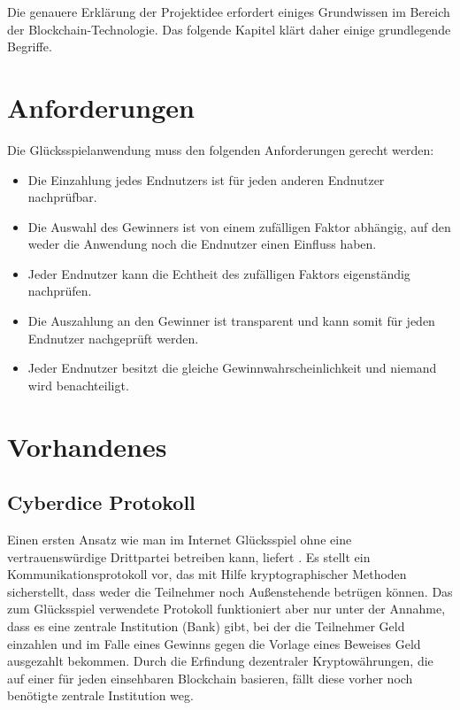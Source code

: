 Die genauere Erklärung der Projektidee erfordert einiges Grundwissen im Bereich der Blockchain-Technologie. Das folgende Kapitel klärt daher einige grundlegende Begriffe.



\section{Anforderungen}
Die Glücksspielanwendung muss den folgenden Anforderungen gerecht werden:
\begin{itemize}
\item Die Einzahlung jedes Endnutzers ist für jeden anderen Endnutzer nachprüfbar.
\item Die Auswahl des Gewinners ist von einem zufälligen Faktor abhängig, auf den weder die Anwendung noch die Endnutzer einen Einfluss haben.
\item Jeder Endnutzer kann die Echtheit des zufälligen Faktors eigenständig nachprüfen.
\item Die Auszahlung an den Gewinner ist transparent und kann somit für jeden Endnutzer nachgeprüft werden.
\item Jeder Endnutzer besitzt die gleiche Gewinnwahrscheinlichkeit und niemand wird benachteiligt.
\end{itemize}


\section{Vorhandenes}

\subsection{Cyberdice Protokoll}

Einen ersten Ansatz wie man im Internet Glücksspiel ohne eine vertrauenswürdige Drittpartei betreiben kann, liefert \cite{cyberdice_paper}. Es stellt ein Kommunikationsprotokoll vor, das mit Hilfe kryptographischer Methoden sicherstellt, dass weder die Teilnehmer noch Außenstehende betrügen können. Das zum Glücksspiel verwendete Protokoll funktioniert aber nur unter der Annahme, dass es eine zentrale Institution (Bank) gibt, bei der die Teilnehmer Geld einzahlen und im Falle eines Gewinns gegen die Vorlage eines Beweises Geld ausgezahlt bekommen.
\space
Durch die Erfindung dezentraler Kryptowährungen, die auf einer für jeden einsehbaren Blockchain basieren, fällt diese vorher noch benötigte zentrale Institution weg.

